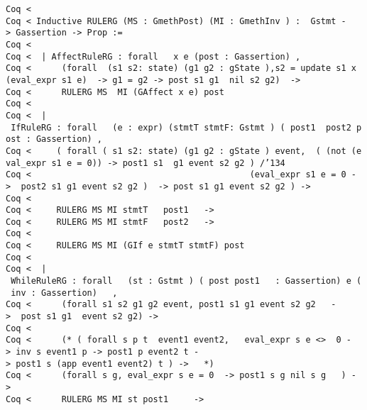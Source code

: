 \documentclass{article}
\begin{document}
{\small
\begin{flushleft}
\texttt{Coq~{<}~}\\
\texttt{Coq~{<}~Inductive~RULERG~(MS~:~GmethPost)~(MI~:~GmethInv~)~:~~Gstmt~-{>}~Gassertion~-{>}~Prop~:=}\\
\texttt{Coq~{<}~~}\\
\texttt{Coq~{<}~~|~AffectRuleRG~:~forall~~~x~e~(post~:~Gassertion)~,~}\\
\texttt{Coq~{<}~~~~~~(forall~~(s1~s2:~state)~(g1~g2~:~gState~),s2~=~update~s1~x~(eval\_expr~s1~e)~~-{>}~g1~=~g2~-{>}~post~s1~g1~~nil~s2~g2)~~-{>}}\\
\texttt{Coq~{<}~~~~~~RULERG~MS~~MI~(GAffect~x~e)~post}\\
\texttt{Coq~{<}~~}\\
\texttt{Coq~{<}~~|~IfRuleRG~:~forall~~~(e~:~expr)~(stmtT~stmtF:~Gstmt~)~(~post1~~post2~post~:~Gassertion)~,~}\\
\texttt{Coq~{<}~~~~~(~forall~(~s1~s2:~state)~(g1~g2~:~gState~)~event,~~(~(not~(eval\_expr~s1~e~=~0))~-{>}~post1~s1~~g1~event~s2~g2~)~/\char'134~}\\
\texttt{Coq~{<}~~~~~~~~~~~~~~~~~~~~~~~~~~~~~~~~~~~~~~~~~~~(eval\_expr~s1~e~=~0~-{>}~~post2~s1~g1~event~s2~g2~)~~-{>}~post~s1~g1~event~s2~g2~)~-{>}}\\
\texttt{Coq~{<}~~~~~}\\
\texttt{Coq~{<}~~~~~RULERG~MS~MI~stmtT~~~post1~~~-{>}}\\
\texttt{Coq~{<}~~~~~RULERG~MS~MI~stmtF~~~post2~~~-{>}}\\
\texttt{Coq~{<}~	}\\
\texttt{Coq~{<}~~~~~RULERG~MS~MI~(GIf~e~stmtT~stmtF)~post~}\\
\texttt{Coq~{<}~}\\
\texttt{Coq~{<}~~|~WhileRuleRG~:~forall~~~(st~:~Gstmt~)~(~post~post1~~~:~Gassertion)~e~(~inv~:~Gassertion)~~~,}\\
\texttt{Coq~{<}~~~~~~(forall~s1~s2~g1~g2~event,~post1~s1~g1~event~s2~g2~~~-{>}~~post~s1~g1~~event~s2~g2)~-{>}}\\
\texttt{Coq~{<}~}\\
\texttt{Coq~{<}~~~~~~(*~(~forall~s~p~t~~event1~event2,~~~eval\_expr~s~e~{<}{>}~~0~-{>}~inv~s~event1~p~-{>}~post1~p~event2~t~-{>}~post1~s~(app~event1~event2)~t~)~-{>}~~~*)}\\
\texttt{Coq~{<}~~~~~~(forall~s~g,~eval\_expr~s~e~=~0~~-{>}~post1~s~g~nil~s~g~~~)~-{>}~~}\\
\texttt{Coq~{<}~~~~~~RULERG~MS~MI~st~post1~~~~~-{>}~}\\

\end{flushleft}}
\end{document}
